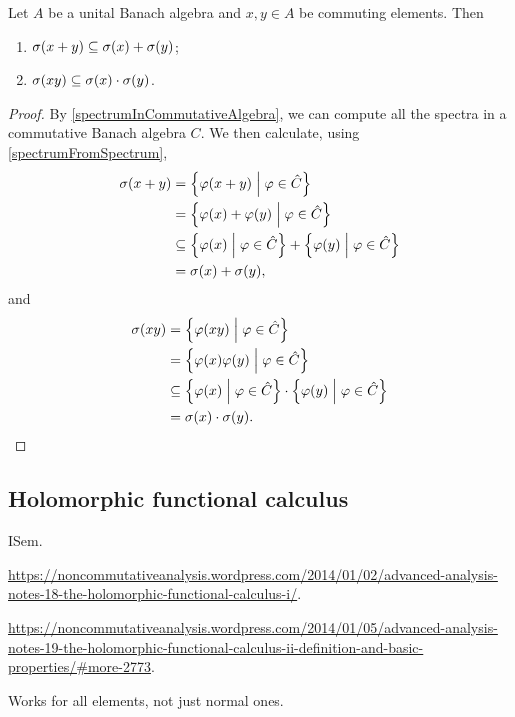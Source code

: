 \begin{proposition} \label{spectrumAlgebraicOperationsOnCommutingElements}
Let $A$ be a unital Banach algebra and $x,y\in A$ be commuting elements. Then
\begin{enumerate}
\item $\sigma(x+y) \subseteq \sigma(x) + \sigma(y)$;
\item $\sigma(xy) \subseteq \sigma(x) \cdot \sigma(y)$.
\end{enumerate}
\end{proposition}
\begin{proof}
By \ref{spectrumInCommutativeAlgebra}, we can compute all the spectra in a commutative Banach algebra $C$. We then calculate, using \ref{spectrumFromSpectrum},
\begin{align*}
\spec(x+y) &= \setbuilder{\varphi(x+y)}{\varphi\in \hat{C}} \\
&= \setbuilder{\varphi(x)+\varphi(y)}{\varphi\in \hat{C}} \\
&\subseteq \setbuilder{\varphi(x)}{\varphi\in \hat{C}} + \setbuilder{\varphi(y)}{\varphi\in \hat{C}} \\
&= \spec(x) + \spec(y),
\end{align*}
and
\begin{align*}
\spec(xy) &= \setbuilder{\varphi(xy)}{\varphi\in \hat{C}} \\
&= \setbuilder{\varphi(x)\varphi(y)}{\varphi\in \hat{C}} \\
&\subseteq \setbuilder{\varphi(x)}{\varphi\in \hat{C}} \cdot \setbuilder{\varphi(y)}{\varphi\in \hat{C}} \\
&= \spec(x) \cdot \spec(y).
\end{align*}
\end{proof}

\subsection{Holomorphic functional calculus}
ISem.

\url{https://noncommutativeanalysis.wordpress.com/2014/01/02/advanced-analysis-notes-18-the-holomorphic-functional-calculus-i/}.

\url{https://noncommutativeanalysis.wordpress.com/2014/01/05/advanced-analysis-notes-19-the-holomorphic-functional-calculus-ii-definition-and-basic-properties/#more-2773}.

Works for all elements, not just normal ones.

